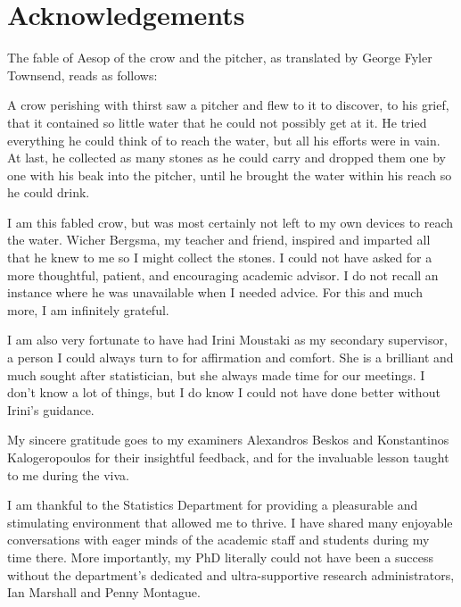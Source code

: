 \documentclass[11pt,twoside,openright]{report}
\begin{document}
\chapter*{Acknowledgements} 

The fable of Aesop of the crow and the pitcher, as translated by George Fyler Townsend, reads as follows:

\begingroup
\singlespacing
\begin{displayquote}
A crow perishing with thirst saw a pitcher and flew to it to discover, to his grief, that it contained so little water that he could not possibly get at it. 
He tried everything he could think of to reach the water, but all his efforts were in vain. 
At last, he collected as many stones as he could carry and dropped them one by one with his beak into the pitcher, until he brought the water within his reach so he could drink.
\end{displayquote}
\endgroup

I am this fabled crow, but was most certainly not left to my own devices to reach the water.
Wicher Bergsma, my teacher and friend, inspired and imparted all that he knew to me so I might collect the stones.
I could not have asked for a more thoughtful, patient, and encouraging academic advisor.
I do not recall an instance where he was unavailable when I needed  advice.
For this and much more, I am infinitely grateful.


I am also very fortunate to have had Irini Moustaki as my secondary supervisor, a person I could always turn to for affirmation and comfort.
She is a brilliant and much sought after statistician, but she always made time for our meetings.
I don't know a lot of things, but I do know I could not have done better without Irini's guidance.

My sincere gratitude goes to my examiners Alexandros Beskos and Konstantinos Kalogeropoulos for their insightful feedback, and for the invaluable lesson taught to me during the viva.

I am thankful to the Statistics Department for providing a pleasurable and stimulating environment that allowed me to thrive.
I have shared many enjoyable conversations with eager minds of the academic staff and students during my time there.
More importantly, my PhD literally could not have been a success without the department's dedicated and ultra-supportive research administrators, Ian Marshall and Penny Montague.
\end{document}
